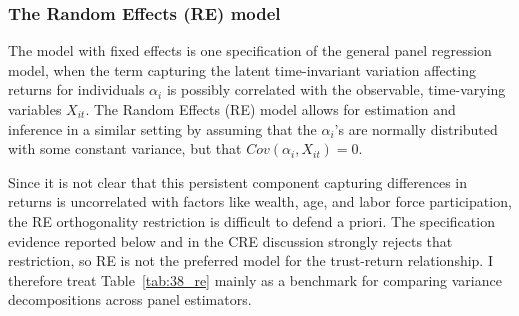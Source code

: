 \begin{table}[H]
\centering
\caption{\textbf{Explaining Estimated Fixed Effect with Time-Invariant Controls}}
\label{tab:38_fe_2nd}
\begin{threeparttable}
\begingroup
\setlength{\tabcolsep}{3pt}%
\renewcommand{\arraystretch}{0.70}%
\small%
\resizebox{\textwidth}{!}{%
%
}%
\endgroup
\begin{tablenotes}[flushleft]
\footnotesize
\item {}%
\end{tablenotes}
\end{threeparttable}
\end{table}


\subsubsection{The Random Effects (RE) model}

\par The model with fixed effects is one specification of the general panel regression model, when the term capturing the latent time-invariant variation affecting returns for individuals $\alpha_i$ is possibly correlated with the observable, time-varying variables $X_{it}$. The Random Effects (RE) model allows for estimation and inference in a similar setting by assuming that the $\alpha_i$'s are normally distributed with some constant variance, but that $Cov(\alpha_i, X_{it}) = 0$.

\par Since it is not clear that this persistent component capturing differences in returns is uncorrelated with factors like wealth, age, and labor force participation, the RE orthogonality restriction is difficult to defend a priori. The specification evidence reported below and in the CRE discussion strongly rejects that restriction, so RE is not the preferred model for the trust-return relationship. I therefore treat Table~\ref{tab:38_re} mainly as a benchmark for comparing variance decompositions across panel estimators.

